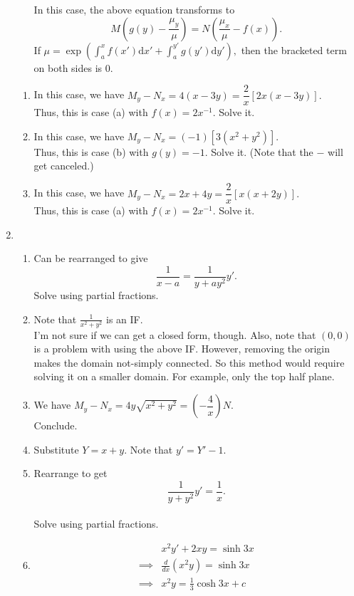 \documentclass{article}
\begin{document}
\begin{enumerate}[label = Q.\arabic*.]
\begin{enumerate}[label = (\alph*)]
		In this case, the above equation transforms to
		\[M\left(g(y) - \frac{\mu_y}{\mu}\right) = N\left(\frac{\mu_x}{\mu} - f(x)\right).\]
		If $\mu = \exp\left(\displaystyle\int_{a}^{x} f(x') \text{d}x' + \int_{a}^{y'} g(y') \text{d}y'\right),$ then the bracketed term on both sides is $0.$
	\end{enumerate}
	\begin{enumerate}[label = (\roman*)] 
		\item In this case, we have $M_y - N_x = 4(x - 3y) = \dfrac{2}{x}[2x(x - 3y)].$\\
		Thus, this is case (a) with $f(x) = 2x^{-1}.$ Solve it.
		\item In this case, we have $M_y - N_x = (-1)[3(x^2 + y^2)].$\\
		Thus, this is case (b) with $g(y) = -1.$ Solve it. (Note that the $-$ will get canceled.)
		\item In this case, we have $M_y - N_x = 2x + 4y = \dfrac{2}{x}[x(x + 2y)].$\\
		Thus, this is case (a) with $f(x) = 2x^{-1}.$ Solve it.		
	\end{enumerate}
	\item 
	\begin{enumerate}[label = (\roman*)] 
		\item Can be rearranged to give
		\[\frac{1}{x - a} = \frac{1}{y + ay^2}y'.\]
		Solve using partial fractions.
		\item Note that $\frac{1}{x^2 + y^2}$ is an IF.\\
		I'm not sure if we can get a closed form, though. Also, note that $(0, 0)$ is a problem with using the above IF. However, removing the origin makes the domain not-simply connected. So this method would require solving it on a smaller domain. For example, only the top half plane.
		\item We have $M_y - N_x = 4y\sqrt{x^2 + y^2} = \left(-\dfrac{4}{x}\right)N.$\\
		Conclude.
		\item Substitute $Y = x + y.$ Note that $y' = Y' - 1.$
		\item Rearrange to get
		\[\frac{1}{y + y^2}y' = \frac{1}{x}.\]\\
		Solve using partial fractions.
		\item 
		\begin{align*} 
			&x^2y' + 2xy = \sinh 3x\\
			\implies &\frac{d}{dx}(x^2y) = \sinh 3x\\
			\implies &x^2y = \frac{1}{3}\cosh 3x + c

\end{align*}
\end{enumerate}
\end{enumerate}
\end{document}
